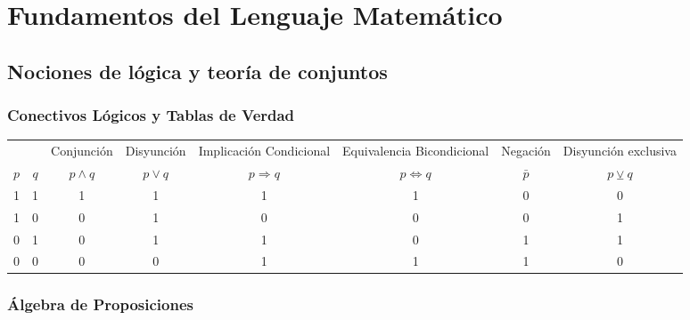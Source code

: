 \section{Fundamentos del Lenguaje Matemático}
\subsection{Nociones de lógica y teoría de conjuntos}
\subsubsection{Conectivos Lógicos y Tablas de Verdad}

\begingroup
\setlength{\tabcolsep}{5pt} %
\renewcommand{\arraystretch}{1.5} %
\begin{center}
  \begin{tabular}{c|c|cccccc}
              &           & Conjunción         & Disyunción       & Implicación Condicional & Equivalencia Bicondicional  & Negación        & Disyunción exclusiva \\
    {\bf $p$} & {\bf $q$} & {\bf $p \wedge q$} & {\bf $p \vee q$} & {\bf $p \Rightarrow q$} & {\bf $p \Leftrightarrow q$} & {\bf $\bar{p}$} & {\bf $p \veebar q$}  \\\hline
    1         & 1         & 1                  & 1                & 1                       & 1                           & 0               & 0                    \\
    1         & 0         & 0                  & 1                & 0                       & 0                           & 0               & 1                    \\
    0         & 1         & 0                  & 1                & 1                       & 0                           & 1               & 1                    \\
    0         & 0         & 0                  & 0                & 1                       & 1                           & 1               & 0
  \end{tabular}
\end{center}
\endgroup

\subsubsection{Álgebra de Proposiciones}

